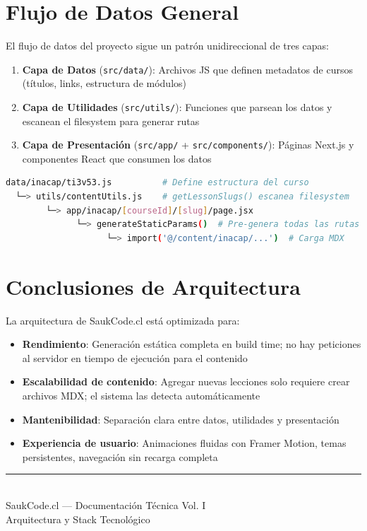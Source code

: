 \documentclass[12pt,a4paper]{article}
\begin{document}
\section{Flujo de Datos General}

El flujo de datos del proyecto sigue un patrón unidireccional de tres capas:

\begin{enumerate}
  \item \textbf{Capa de Datos} (\texttt{src/data/}): Archivos JS que definen metadatos de cursos (títulos, links, estructura de módulos)
  \item \textbf{Capa de Utilidades} (\texttt{src/utils/}): Funciones que parsean los datos y escanean el filesystem para generar rutas
  \item \textbf{Capa de Presentación} (\texttt{src/app/} + \texttt{src/components/}): Páginas Next.js y componentes React que consumen los datos
\end{enumerate}

\begin{lstlisting}[language=bash, caption={Flujo de datos simplificado}]
data/inacap/ti3v53.js          # Define estructura del curso
  └─> utils/contentUtils.js    # getLessonSlugs() escanea filesystem
        └─> app/inacap/[courseId]/[slug]/page.jsx
              └─> generateStaticParams()  # Pre-genera todas las rutas
                    └─> import('@/content/inacap/...')  # Carga MDX
\end{lstlisting}

\section{Conclusiones de Arquitectura}

La arquitectura de SaukCode.cl está optimizada para:

\begin{itemize}
  \item \textbf{Rendimiento}: Generación estática completa en build time; no hay peticiones al servidor en tiempo de ejecución para el contenido
  \item \textbf{Escalabilidad de contenido}: Agregar nuevas lecciones solo requiere crear archivos MDX; el sistema las detecta automáticamente
  \item \textbf{Mantenibilidad}: Separación clara entre datos, utilidades y presentación
  \item \textbf{Experiencia de usuario}: Animaciones fluidas con Framer Motion, temas persistentes, navegación sin recarga completa
\end{itemize}

\vspace{1cm}
\begin{center}
\rule{8cm}{0.4pt}\\[0.3cm]
{\small\color{codegray} SaukCode.cl --- Documentación Técnica Vol. I\\
Arquitectura y Stack Tecnológico}
\end{center}
\end{document}
